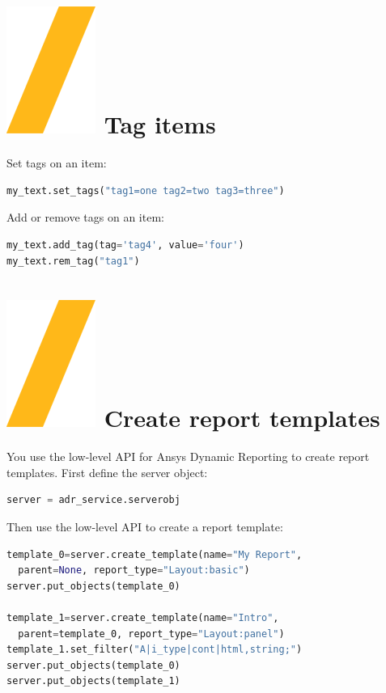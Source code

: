 \documentclass[9pt,landscape]{article}
\begin{document}
\begin{multicols}{3}
\section{\includegraphics[height=\fontcharht\font`\S]{slash.png}  Tag items}
Set tags on an item:

\begin{lstlisting}[language=Python]
my_text.set_tags("tag1=one tag2=two tag3=three")
\end{lstlisting} 

Add or remove tags on an item:
\begin{lstlisting}[language=Python]
my_text.add_tag(tag='tag4', value='four')
my_text.rem_tag("tag1")
\end{lstlisting} 

\section{\includegraphics[height=\fontcharht\font`\S]{slash.png} Create report templates}
You use the low-level API for Ansys Dynamic Reporting to create report templates. First define the server object:
\begin{lstlisting}[language=Python]
server = adr_service.serverobj
\end{lstlisting}
Then use the low-level API to create a report template:
\begin{lstlisting}[language=Python]
template_0=server.create_template(name="My Report", 
  parent=None, report_type="Layout:basic")
server.put_objects(template_0)

template_1=server.create_template(name="Intro", 
  parent=template_0, report_type="Layout:panel")
template_1.set_filter("A|i_type|cont|html,string;")
server.put_objects(template_0)
server.put_objects(template_1)


\end{lstlisting}
\end{multicols}
\end{document}
